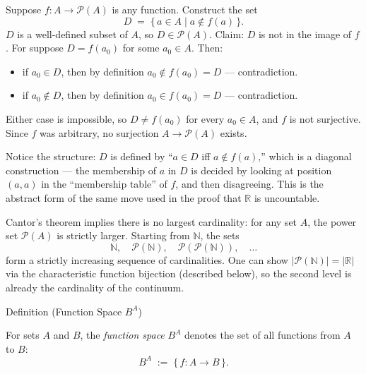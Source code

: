 \begin{remark*}
Suppose $f : A \to \mathcal{P}(A)$ is any function. Construct the set
\[
D \;=\; \{\, a \in A \mid a \notin f(a) \,\}.
\]
$D$ is a well-defined subset of $A$, so $D \in \mathcal{P}(A)$. Claim: $D$
is not in the image of $f$. For suppose $D = f(a_0)$ for some $a_0 \in A$.
Then:
\begin{itemize}
\item if $a_0 \in D$, then by definition $a_0 \notin f(a_0) = D$ — contradiction.
\item if $a_0 \notin D$, then by definition $a_0 \in f(a_0) = D$ — contradiction.
\end{itemize}
Either case is impossible, so $D \neq f(a_0)$ for every $a_0 \in A$, and $f$
is not surjective. Since $f$ was arbitrary, no surjection $A \to
\mathcal{P}(A)$ exists.

Notice the structure: $D$ is defined by ``$a \in D$ iff $a \notin f(a)$,''
which is a diagonal construction — the membership of $a$ in $D$ is decided
by looking at position $(a,a)$ in the ``membership table'' of $f$, and then
disagreeing. This is the abstract form of the same move used in the proof
that $\mathbb{R}$ is uncountable.
\end{remark*}

\begin{remark*}
Cantor's theorem implies there is no largest cardinality: for any set $A$,
the power set $\mathcal{P}(A)$ is strictly larger. Starting from $\mathbb{N}$,
the sets
\[
\mathbb{N},\quad
\mathcal{P}(\mathbb{N}),\quad
\mathcal{P}(\mathcal{P}(\mathbb{N})),\quad \dots
\]
form a strictly increasing sequence of cardinalities. One can show
$|\mathcal{P}(\mathbb{N})| = |\mathbb{R}|$ via the characteristic function
bijection (described below), so the second level is already the cardinality
of the continuum.
\end{remark*}


\begin{definitionbox}{Definition (Function Space $B^A$)}
\begin{definition}\label{def:function-space}
For sets $A$ and $B$, the \emph{function space} $B^A$ denotes the set of
all functions from $A$ to $B$:
\[
B^A \;:=\; \{\, f : A \to B \,\}.
\]
\end{definition}
\end{definitionbox}

